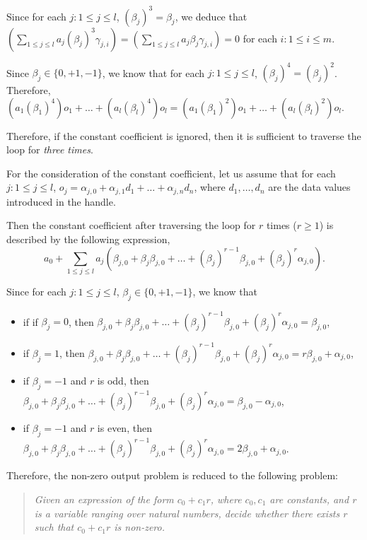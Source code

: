 Since for each $j: 1\le j \le l$, $(\beta_j)^3=\beta_j$, we deduce that $(\sum \limits_{1 \le j \le l} a_j (\beta_{j})^3\gamma_{j,i}) = (\sum \limits_{1 \le j \le l} a_j \beta_{j} \gamma_{j,i}) =0$ for each $i: 1\le i \le m$.

Since $\beta_j \in \{0,+1,-1\}$, we know that for each $j: 1\le j \le l$, $(\beta_j)^4=(\beta_j)^2$. Therefore, $(a_1 (\beta_1)^4) o_1 + \dots + (a_l (\beta_l)^4) o_l=(a_1 (\beta_1)^2) o_1 + \dots + (a_l (\beta_l)^2) o_l$.

Therefore, if the constant coefficient is ignored, then it is sufficient to traverse the loop for \emph{three times}.

For the consideration of the constant coefficient, let us assume that for each $j: 1 \le j \le l$, 
$o_j = \alpha_{j,0} + \alpha_{j,1} d_1+ \dots + \alpha_{j,n}d_n$, where $d_1,\dots,d_n$ are the data values introduced in the handle.

Then the constant coefficient after traversing the loop for $r$ times ($r \ge 1$) is described by the following expression,
\[a_0 + \sum \limits_{1 \le j \le l} a_j (\beta_{j,0} + \beta_{j} \beta_{j,0} + \dots + (\beta_j)^{r-1} \beta_{j,0} + (\beta_j)^r \alpha_{j,0}).\]

Since for each $j: 1 \le j \le l$, $\beta_j \in \{0,+1,-1\}$, we know that 
\begin{itemize}
\item if if $\beta_j=0$, then $\beta_{j,0} + \beta_{j} \beta_{j,0} + \dots + (\beta_j)^{r-1} \beta_{j,0} + (\beta_j)^r \alpha_{j,0}=\beta_{j,0}$,
%
\item if $\beta_j=1$, then $\beta_{j,0} + \beta_{j} \beta_{j,0} + \dots + (\beta_j)^{r-1} \beta_{j,0} + (\beta_j)^r \alpha_{j,0}=r\beta_{j,0} + \alpha_{j,0}$,
%
\item if $\beta_j = -1$ and $r$ is odd, then $\beta_{j,0} + \beta_{j} \beta_{j,0} + \dots + (\beta_j)^{r-1} \beta_{j,0} + (\beta_j)^r \alpha_{j,0}= \beta_{j,0} - \alpha_{j,0}$,

\item if $\beta_j = -1$ and $r$ is even, then $\beta_{j,0} + \beta_{j} \beta_{j,0} + \dots + (\beta_j)^{r-1} \beta_{j,0} + (\beta_j)^r \alpha_{j,0}= 2\beta_{j,0} + \alpha_{j,0}$.
\end{itemize}

Therefore, the non-zero output problem is reduced to the following problem: 
\begin{quote}
\it Given an expression of the form $c_0+c_1 r$, where $c_0 ,c_1$ are constants, and $r$ is a variable ranging over natural numbers, decide whether there exists $r$ such that $c_0+ c_1 r$ is non-zero. 
\end{quote}

